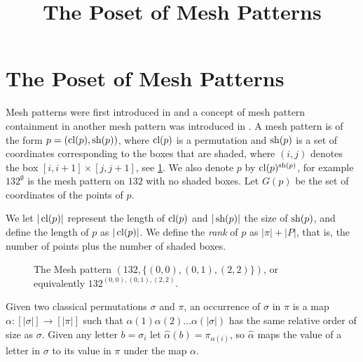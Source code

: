 \documentclass[11pt,a4paper,oneside]{article}
\title{The Poset of Mesh Patterns}
\begin{document}
	\maketitle



\section{The Poset of Mesh Patterns}

Mesh patterns were first introduced in \cite{Bra11} and a concept of mesh
pattern containment in another mesh pattern was introduced in \cite{TU17}. A
mesh pattern is of the form $p=(\operatorname{\textrm{cl}}(p),\operatorname{\textrm{sh}}(p))$, where $\operatorname{\textrm{cl}}(p)$ is a permutation
and $\operatorname{\textrm{sh}}(p)$ is a set of coordinates corresponding to the boxes that are shaded,
where $(i,j)$ denotes the box $[i,i+1]\times[j,j+1]$, see \cref{fig:132}. We
also denote $p$ by $\operatorname{\textrm{cl}}(p)^{\operatorname{\textrm{sh}}(p)}$, for example $132^\emptyset$ is the mesh
pattern on $132$ with no shaded boxes. Let $G(p)$ be the set of coordinates of
the points of $p$.

We let $|\operatorname{\textrm{cl}}(p)|$ represent the length of $\operatorname{\textrm{cl}}(p)$ and $|\operatorname{\textrm{sh}}(p)|$ the size of
$\operatorname{\textrm{sh}}(p)$, and define the length of $p$ as $|\operatorname{\textrm{cl}}(p)|$. We define the \emph{rank}
of $p$ as $|\pi|+|P|$, that is, the number of points plus the number of shaded
boxes.


\begin{figure}\centering{}
\caption{The Mesh pattern $(132,\{(0,0),(0,1),(2,2)\})$, or equivalently $132^{(0,0),(0,1),(2,2)}$.}\label{fig:132}\end{figure}

Given two classical permutations $\sigma$ and $\pi$, an occurrence of $\sigma$
in $\pi$ is a map $\alpha:[|\sigma|]\rightarrow[|\pi|]$ such that
$\alpha(1)\alpha(2)\ldots\alpha(|\sigma|)$ has the same relative order of size
as $\sigma$. Given any letter $b=\sigma_i$ let
$\hat{\alpha}(b)=\pi_{\alpha(i)}$, so $\hat{\alpha}$ maps the value of a letter
in $\sigma$ to its value in $\pi$ under the map $\alpha$.
\end{document}
